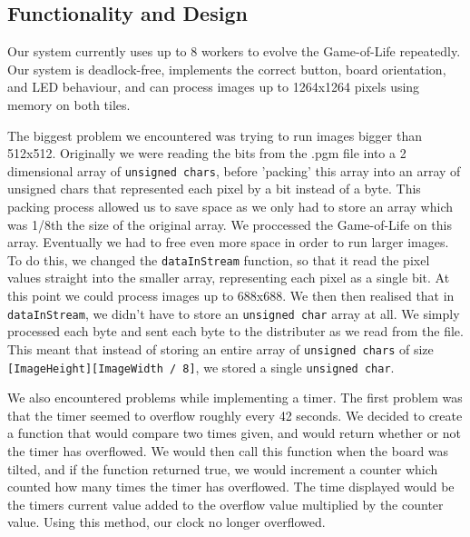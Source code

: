 \documentclass{article}
\begin{document}
\begin{multicols}{2}

\section{Functionality and Design}
Our system currently uses up to 8 workers to evolve the Game-of-Life repeatedly. Our system is
deadlock-free, implements the correct button, board orientation, and LED behaviour, and can process
images up to 1264x1264 pixels using memory on both tiles.

\vspace{5mm}

The biggest problem we encountered was trying to run images bigger than 512x512. Originally we were
reading the bits from the .pgm file into a 2 dimensional array of \texttt{unsigned chars}, before 'packing'
this array into an array of unsigned chars that represented each pixel by a bit instead of a byte.
This packing process allowed us to save space as we only had to store an array which was 1/8th the
size of the original array. We proccessed the Game-of-Life on this array. Eventually we had to
free even more space in order to run larger images. To do this, we changed the \texttt{dataInStream} function,
so that it read the pixel values straight into the smaller array, representing each pixel as a
single bit. At this point we could process images up to 688x688. We then then realised that in
\texttt{dataInStream}, we didn't have to store an \texttt{unsigned char} array at all. We simply processed
each byte and sent each byte to the distributer as we read from the file. This meant that instead
of storing an entire array of \texttt{unsigned chars} of size \texttt{[ImageHeight][ImageWidth / 8]}, we stored a single
\texttt{unsigned char}.

\vspace{5mm}

We also encountered problems while implementing a timer. The first problem was that the timer seemed
to overflow roughly every 42 seconds. We decided to create a function that would compare two times
given, and would return whether or not the timer has overflowed. We would then call this function when
the board was tilted, and if the function returned true, we would increment a counter which counted
how many times the timer has overflowed. The time displayed would be the timers current value added
to the overflow value multiplied by the counter value. Using this method, our clock no longer
overflowed.


\end{multicols}
\end{document}
